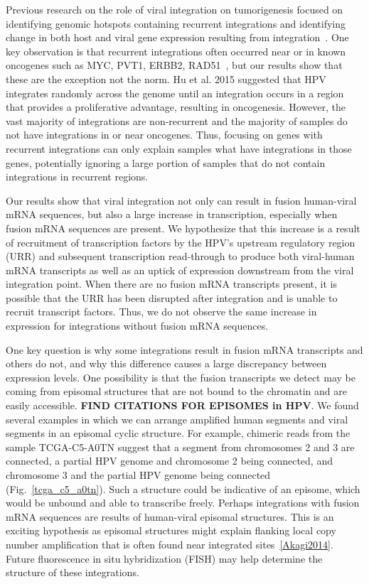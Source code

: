 \documentclass[10pt]{article}
\begin{document}
Previous research on the role of viral integration on tumorigenesis focused on identifying genomic hotspots containing recurrent integrations and identifying change in both host and viral gene expression resulting from integration~\cite{Tang2013,Lawrence2015,Hu2015,Zhang2016}.  One key observation is that recurrent integrations often occurred near or in known oncogenes such as MYC, PVT1, ERBB2, RAD51~\cite{Tang2013}, but our results show that these are the exception not the norm.  Hu et al. 2015 suggested that HPV integrates randomly across the genome until an integration occurs in a region that provides a proliferative advantage, resulting in oncogenesis.  However, the vast majority of integrations are non-recurrent and the majority of samples do not have integrations in or near oncogenes.  Thus, focusing on genes with recurrent integrations can only explain samples what have integrations in those genes, potentially ignoring a large portion of samples that do not contain integrations in recurrent regions.

Our results show that viral integration not only can result in fusion human-viral mRNA sequences, but also a large increase in transcription, especially when fusion mRNA sequences are present.  We hypothesize that this increase is a result of recruitment of transcription factors by the HPV's upstream regulatory region (URR) and subsequent transcription read-through to produce both viral-human mRNA transcripts as well as an uptick of expression downstream from the viral integration point.  When there are no fusion mRNA transcripts present, it is possible that the URR has been disrupted after integration and is unable to recruit transcript factors.  Thus, we do not observe the same increase in expression for integrations without fusion mRNA sequences.

One key question is why some integrations result in fusion mRNA transcripts and others do not, and why this difference causes a large discrepancy between expression levels.  One possibility is that the fusion transcripts we detect may be coming from episomal structures that are not bound to the chromatin and are easily accessible.  \textbf{FIND CITATIONS FOR EPISOMES in HPV}.  We found several examples in which we can arrange amplified human segments and viral segments in an episomal cyclic structure.  For example, chimeric reads from the sample TCGA-C5-A0TN suggest that a segment from chromosomes 2 and 3 are connected, a partial HPV genome and chromosome 2 being connected, and chromosome 3 and the partial HPV genome being connected  (Fig.~\ref{tcga_c5_a0tn}).  Such a structure could be indicative of an episome, which would be unbound and able to transcribe freely.  Perhaps integrations with fusion mRNA sequences are results of human-viral episomal structures.  This is an exciting hypothesis as episomal structures might explain flanking local copy number amplification that is often found near integrated sites~\ref{Akagi2014}.  Future fluorescence in situ hybridization (FISH) may help determine the structure of these integrations.
\end{document}
